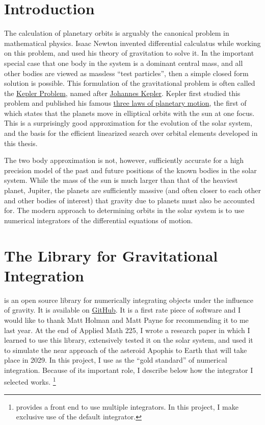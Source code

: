 \section{Introduction}
\label{section_intro}
The calculation of planetary orbits is arguably the canonical problem in mathematical physics.
Isaac Newton invented differential calculatus while working on this problem, and used his theory of gravitation to solve it.
In the important special case that one body in the system is a dominant central mass,
and all other bodies are viewed as massless ``test particles'', then a simple closed form solution is possible.
This formulation of the gravitational problem is often called the \href{https://en.wikipedia.org/wiki/Kepler_problem}{Kepler Problem},
named after \href{https://en.wikipedia.org/wiki/Johannes_Kepler}{Johannes Kepler}.
Kepler first studied this problem and published his famous \href{https://en.wikipedia.org/wiki/Kepler\%27s_laws_of_planetary_motion}{three laws of planetary motion},
the first of which states that the planets move in elliptical orbits with the sun at one focus.
This is a surprisingly good approximation for the evolution of the solar system, and the basis for the efficient linearized search over orbital elements developed in this thesis.

The two body approximation is not, however, sufficiently accurate for a high precision model of the past and future positions of the known bodies in the solar system.
While the mass of the sun is much larger than that of the heaviest planet, Jupiter, the planets are sufficiently massive
(and often closer to each other and other bodies of interest) that gravity due to planets must also be accounted for.
The modern approach to determining orbits in the solar system is to use numerical integrators of the differential equations of motion.

\section{The  Library for Gravitational Integration}
\label{section_rebound}
 is an open source library for numerically integrating objects under the influence of gravity.
It is available on \href{https://github.com/hannorein/rebound}{GitHub}.
It is a first rate piece of software and I would like to thank Matt Holman and Matt Payne for recommending it to me last year.
At the end of Applied Math 225, I wrote a research paper in which I learned to use this library, 
extensively tested it on the solar system, and used it to simulate the near approach of the asteroid Apophis to Earth that will take place in 2029.
In this project, I use  as the ``gold standard'' of numerical integration.
Because of its important role, I describe below how the  integrator I selected works.
\footnote{ provides a front end to use multiple integrators. In this project, I make exclusive use of the default  integrator.}

